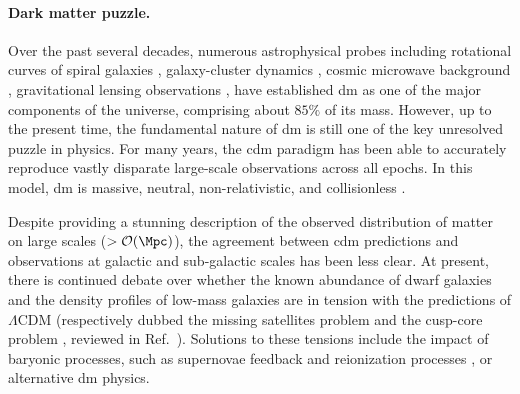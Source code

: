 \paragraph*{Dark matter puzzle.} Over the past several decades, numerous astrophysical probes including rotational curves of spiral galaxies \cite{Rubin:1980zd}, galaxy-cluster dynamics \cite{Zwicky:1933gu}, cosmic microwave background \cite{Planck:2015fie}, gravitational lensing observations \cite{Taylor:1998uk}, have established \gls*{dm} as one of the major components of the universe, comprising about $85\%$ of its mass. However, up to the present time, the fundamental nature of \gls*{dm} is still one of the key unresolved puzzle in physics. For many years, the \gls*{cdm} paradigm has been able to accurately reproduce vastly disparate large-scale observations across all epochs. In this model, \gls*{dm} is massive, neutral, non-relativistic, and collisionless \cite{Peebles:1982ff}. %

Despite providing a stunning description of the observed distribution of matter on large scales ($>\order{\si{\Mpc}}$), the agreement between \gls*{cdm} predictions and observations at galactic and sub-galactic scales has been less clear. At present, there is continued debate over whether the known abundance of dwarf galaxies and the density profiles of low-mass galaxies are in tension with the predictions of $\Lambda$CDM (respectively dubbed the missing satellites problem \cite{Moore:1999nt,Klypin:1999uc} and the cusp-core problem \cite{deBlok:1997zlw}, reviewed in Ref.~\cite{Bullock:2017xww}).
Solutions to these tensions include the impact of baryonic processes, such as supernovae feedback and reionization processes \cite{Bullock:2010uy}, or alternative \gls*{dm} physics. %

